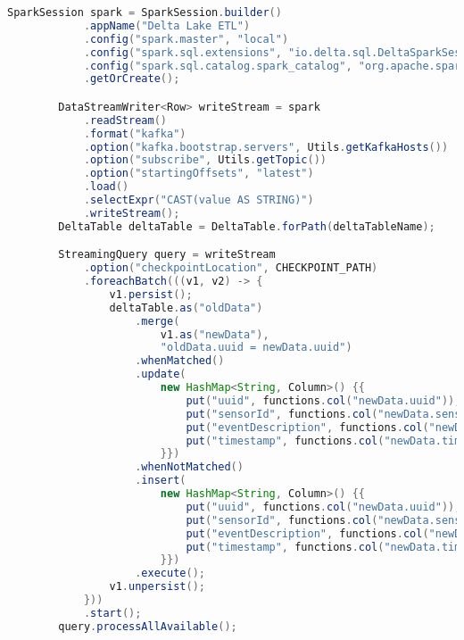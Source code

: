 \documentclass[%
bachelor,    %
subf,        %
href,        %
colorlinks,  %
]{disser}
\begin{document}
\begin{lstlisting}[caption={Запись из Kafka в Delta Lake таблицу},captionpos=b,label={lst:5},language=Java]
        SparkSession spark = SparkSession.builder()
            .appName("Delta Lake ETL")
            .config("spark.master", "local")
            .config("spark.sql.extensions", "io.delta.sql.DeltaSparkSessionExtension")
            .config("spark.sql.catalog.spark_catalog", "org.apache.spark.sql.delta.catalog.DeltaCatalog")
            .getOrCreate();

        DataStreamWriter<Row> writeStream = spark
            .readStream()
            .format("kafka")
            .option("kafka.bootstrap.servers", Utils.getKafkaHosts())
            .option("subscribe", Utils.getTopic())
            .option("startingOffsets", "latest")
            .load()
            .selectExpr("CAST(value AS STRING)")
            .writeStream();
        DeltaTable deltaTable = DeltaTable.forPath(deltaTableName);

        StreamingQuery query = writeStream
            .option("checkpointLocation", CHECKPOINT_PATH)
            .foreachBatch(((v1, v2) -> {
                v1.persist();
                deltaTable.as("oldData")
                    .merge(
                        v1.as("newData"),
                        "oldData.uuid = newData.uuid")
                    .whenMatched()
                    .update(
                        new HashMap<String, Column>() {{
                            put("uuid", functions.col("newData.uuid"));
                            put("sensorId", functions.col("newData.sensorId"));
                            put("eventDescription", functions.col("newData.eventDescription"));
                            put("timestamp", functions.col("newData.timestamp"));
                        }})
                    .whenNotMatched()
                    .insert(
                        new HashMap<String, Column>() {{
                            put("uuid", functions.col("newData.uuid"));
                            put("sensorId", functions.col("newData.sensorId"));
                            put("eventDescription", functions.col("newData.eventDescription"));
                            put("timestamp", functions.col("newData.timestamp"));
                        }})
                    .execute();
                v1.unpersist();
            }))
            .start();
        query.processAllAvailable();
\end{lstlisting}
\newpage
\end{document}
